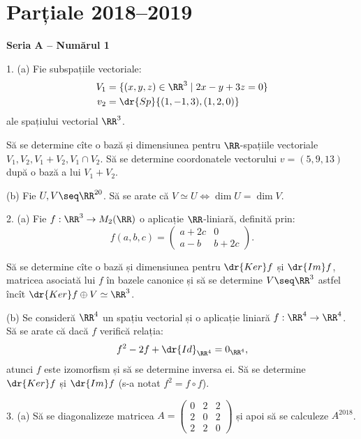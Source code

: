 
\chapter{Parțiale 2018--2019}

\textbf{Seria A -- Numărul 1}

1. (a) Fie subspațiile vectoriale:
\begin{align*}
  V_1 &= \{ (x, y, z) \in \RR^3 \mid 2x - y + 3z = 0 \} \\
  v_2 &= \dr{Sp}\{ (1, -1, 3), (1, 2, 0) \}
\end{align*}
ale spațiului vectorial $ \RR^3 $.

Să se determine cîte o bază și dimensiunea pentru $ \RR $-spațiile vectoriale
$ V_1, V_2, V_1 + V_2, V_1 \cap V_2 $. Să se determine coordonatele vectorului
$ v = (5, 9, 13) $ după o bază a lui $ V_1 + V_2 $.

(b) Fie $ U, V \seq \RR^{20} $. Să se arate că $ V \simeq U \Leftrightarrow \dim U = \dim V $.

\vspace{0.5cm}

2. (a) Fie $ f : \RR^3 \to M_2(\RR) $ o aplicație $ \RR $-liniară, definită prin:
\[
  f(a, b, c) = %
  \begin{pmatrix}
    a + 2c & 0 \\
    a - b & b + 2c
  \end{pmatrix}.
\]

Să se determine cîte o bază și dimensiunea pentru $ \dr{Ker} f $ și $ \dr{Im}f $, matricea
asociată lui $ f $ în bazele canonice și să se determine $ V \seq \RR^3 $ astfel
încît $ \dr{Ker}f \oplus V \simeq \RR^3 $.

(b) Se consideră $ \RR^4 $ un spațiu vectorial și o aplicație liniară
$ f : \RR^4 \to \RR^4 $. Să se arate că dacă $ f $ verifică relația:
\[
  f^2 - 2f + \dr{Id}_{\RR^4} = 0_{\RR^4},
\]
atunci $ f $ este izomorfism și să se determine inversa ei. Să se determine
$ \dr{Ker}f $ și $ \dr{Im}f $ (s-a notat $ f^2 = f \circ f $).

\vspace{0.5cm}

3. (a) Să se diagonalizeze matricea
$
A = \begin{pmatrix}
  0 & 2 & 2 \\
  2 & 0 & 2 \\
  2 & 2 & 0
\end{pmatrix}
$
și apoi să se calculeze $ A^{2018} $.

